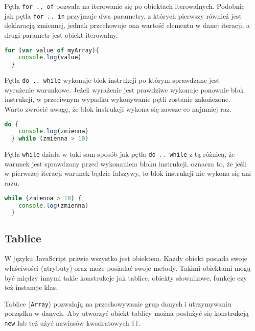 \par Pętla \texttt{for .. of} pozwala na iterowanie się po obiektach iterowalnych. Podobnie jak pętla \texttt{for .. in} przyjmuje dwa parametry, z których pierwszy również jest deklaracją zmiennej, jednak przechowuje ona wartość elementu w danej iteracji, a drugi parametr jest obiekt iterowalny.

\begin{lstlisting}[language=JavaScript, caption=Przykład użycia instrukcji \texttt{for .. of}, label=alg:instrukcjaFor3]
  for (var value of myArray){
    console.log(value)
  }
\end{lstlisting}

\par Pętla \texttt{do .. while} wykonuje blok instrukcji po którym sprawdzane jest wyrażenie warunkowe. Jeżeli wyrażenie jest prawdziwe wykonuje ponownie blok instrukcji, w przeciwnym wypadku wykonywanie pętli zostanie zakończone. Warto zwrócić uwagę, że blok instrukcji wykona się zawsze co najmniej raz.

\begin{lstlisting}[language=JavaScript, caption=Przykład użycia instrukcji \texttt{do .. while}, label=alg:instrukcjaWhile1]
  do {
    console.log(zmienna)
  } while (zmienna > 10)
\end{lstlisting}

\par Pętla \texttt{while} działa w taki sam sposób jak pętla \texttt{do .. while} z tą różnicą, że warunek jest sprawdzany przed wykonaniem bloku instrukcji. oznacza to, że jeśli w pierwszej iteracji warunek będzie fałszywy, to blok instrukcji nie wykona się ani razu.

\begin{lstlisting}[language=JavaScript, caption=Przykład użycia instrukcji \texttt{while}, label=alg:instrukcjaWhile2]
  while (zmienna > 10) {
    console.log(zmienna)
  }
\end{lstlisting}


\subsection{Tablice}
\par W języku JavaScript prawie wszystko jest obiektem. Każdy obiekt posiada swoje właściwości (atrybuty) oraz może posiadać swoje metody. Takimi obiektami mogą być między innymi takie konstrukcje jak tablice, obiekty słownikowe, funkcje czy też instancje klas.

\par Tablice (\texttt{Array}) pozwalają na przechowywanie grup danych i utrzymywaniu porządku w danych. Aby utworzyć obiekt tablicy można posłużyć się konstrukcją \texttt{new} lub też użyć nawiasów kwadratowych \texttt{[]}. 

